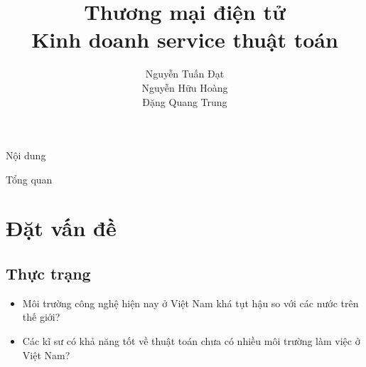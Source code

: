 \documentclass{beamer}
\title[]{{\huge \bf Thương mại điện tử}\\
 \large Kinh doanh service thuật toán }
\author[]{
Nguyễn Tuấn Đạt\\%
Nguyễn Hữu Hoàng \\
Đặng Quang Trung\\
}
\institute[]{
}
\newcommand{\bi}{\begin{itemize}}
\newcommand{\ei}{\end{itemize}}
\begin{document}
\begin{frame}
\titlepage
\end{frame}

\begin{frame}{Nội dung}
\tableofcontents
\end{frame}

\begin{frame}{Tổng quan}
\section{ Đặt vấn đề}
\subsection{Thực trạng}
\bi 
\item Môi trường công nghệ hiện nay ở Việt Nam khá tụt hậu so với các nước trên thế giới?
\item Các kĩ sư có khả năng tốt về thuật toán chưa có nhiều môi trường làm việc ở Việt Nam?
\ei 
\end{frame}
\end{document}
